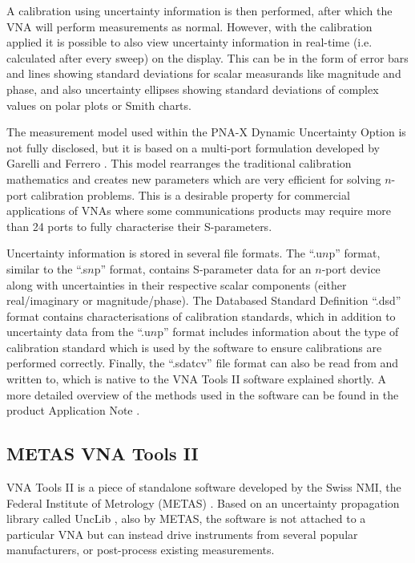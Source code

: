 \documentclass[../thesis/thesis.tex]{subfiles}
\begin{document}
A calibration using uncertainty information is then performed, after which the VNA will perform measurements as normal. However, with the calibration applied it is possible to also view uncertainty information in real-time (i.e. calculated after every sweep) on the display. This can be in the form of error bars and lines showing standard deviations for scalar measurands like magnitude and phase, and also uncertainty ellipses showing standard deviations of complex values on polar plots or Smith charts.

The measurement model used within the PNA-X Dynamic Uncertainty Option is not fully disclosed, but it is based on a multi-port formulation developed by Garelli and Ferrero \cite{Garelli_2012}. This model rearranges the traditional calibration mathematics and creates new parameters which are very efficient for solving $n$-port calibration problems. This is a desirable property for commercial applications of VNAs where some communications products may require more than 24 ports to fully characterise their S-parameters.

Uncertainty information is stored in several file formats. The ``.u$n$p'' format, similar to the ``.s$n$p'' format, contains S-parameter data for an $n$-port device along with uncertainties in their respective scalar components (either real/imaginary or magnitude/phase). The Databased Standard Definition ``.dsd'' format contains characterisations of calibration standards, which in addition to uncertainty data from the ``.u$n$p'' format includes information about the type of calibration standard which is used by the software to ensure calibrations are performed correctly. Finally, the ``.sdatcv'' file format can also be read from and written to, which is native to the VNA Tools II software explained shortly. A more detailed overview of the methods used in the software can be found in the product Application Note \cite{Keysight_2019}.

\subsection{METAS VNA Tools II}

VNA Tools II is a piece of standalone software developed by the Swiss NMI, the Federal Institute of Metrology (METAS) \cite{VNATools}. Based on an uncertainty propagation library called UncLib \cite{UncLib}, also by METAS, the software is not attached to a particular VNA but can instead drive instruments from several popular manufacturers, or post-process existing measurements.
\end{document}

